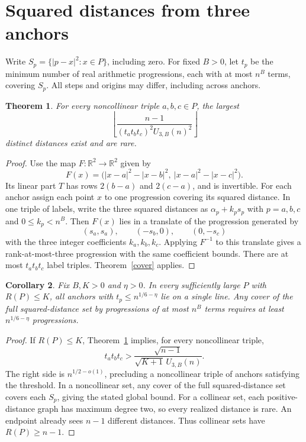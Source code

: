 \documentclass[10pt,letterpaper]{article}
\newtheorem{theorem}{Theorem}
\newtheorem{corollary}[theorem]{Corollary}
\newcommand{\R}{\mathbb R}
\newcommand{\floor}[1]{\left\lfloor #1\right\rfloor}
\begin{document}
\section{Squared distances from three anchors}
Write $S_p=\{|p-x|^2:x\in P\}$, including zero. For fixed $B>0$, let $t_p$ be the minimum number of real arithmetic progressions, each with at most $n^B$ terms, covering $S_p$. All steps and origins may differ, including across anchors.
\begin{theorem}\label{anchors}
For every noncollinear triple $a,b,c\in P$, the largest
\[
 \floor{\frac{n-1}{(t_at_bt_c)^2 U_{3,B}(n)^2}}
\]
distinct distances exist and are rare.
\end{theorem}
\begin{proof}
Use the map $F:\R^2\to\R^2$ given by
\[
 F(x)=\bigl(|x-a|^2-|x-b|^2,\ |x-a|^2-|x-c|^2\bigr).
\]
Its linear part $T$ has rows $2(b-a)$ and $2(c-a)$, and is invertible. For each anchor assign each point $x$ to one progression covering its squared distance. In one triple of labels, write the three squared distances as $\alpha_p+k_p s_p$ with $p=a,b,c$ and $0\le k_p<n^B$. Then $F(x)$ lies in a translate of the progression generated by
\[
 (s_a,s_a),\qquad(-s_b,0),\qquad(0,-s_c)
\]
with the three integer coefficients $k_a,k_b,k_c$. Applying $F^{-1}$ to this translate gives a rank-at-most-three progression with the same coefficient bounds. There are at most $t_at_bt_c$ label triples. Theorem~\ref{cover} applies.
\end{proof}

\begin{corollary}\label{obstruction}
Fix $B,K>0$ and $\eta>0$. In every sufficiently large $P$ with $R(P)\le K$, all anchors with $t_p\le n^{1/6-\eta}$ lie on a single line. Any cover of the full squared-distance set by progressions of at most $n^B$ terms requires at least $n^{1/6-\eta}$ progressions.
\end{corollary}
\begin{proof}
If $R(P)\le K$, Theorem~\ref{anchors} implies, for every noncollinear triple,
\[
 t_at_bt_c>\frac{\sqrt{n-1}}{\sqrt{K+1}\,U_{3,B}(n)}.
\]
The right side is $n^{1/2-o(1)}$, precluding a noncollinear triple of anchors satisfying the threshold. In a noncollinear set, any cover of the full squared-distance set covers each $S_p$, giving the stated global bound. For a collinear set, each positive-distance graph has maximum degree two, so every realized distance is rare. An endpoint already sees $n-1$ different distances. Thus collinear sets have $R(P)\ge n-1$.
\end{proof}
\end{document}

